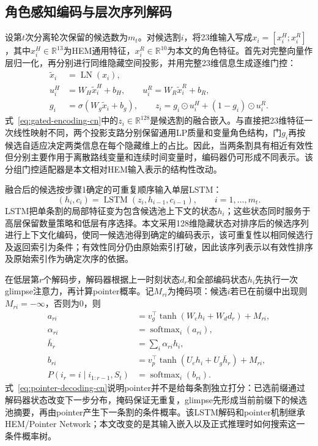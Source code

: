 \documentclass[final,5p,times,twocolumn]{elsarticle}
\begin{document}
\subsection{角色感知编码与层次序列解码}

设第$t$次分离轮次保留的候选数为$m_t$。对候选割$i$，将23维输入写成$x_i=[x_i^{H};x_i^{R}]$，其中$x_i^{H}\in\mathbb R^{13}$为HEM通用特征，$x_i^{R}\in\mathbb R^{10}$为本文的角色特征。首先对完整向量作层归一化，再分别进行同维隐藏空间投影，并用完整23维信息生成逐维门控：
\begin{equation}
\begin{aligned}
\widetilde x_i&=\operatorname{LN}(x_i),\\
u_i^{H}&=W_H\widetilde x_i^{H}+b_H,\qquad
u_i^{R}=W_R\widetilde x_i^{R}+b_R,\\
g_i&=\sigma(W_g\widetilde x_i+b_g),\qquad
z_i=g_i\odot u_i^{H}+(1-g_i)\odot u_i^{R}.
\end{aligned}
\label{eq:gated-encoding-cn}
\end{equation}
式~\eqref{eq:gated-encoding-cn}中的$z_i\in\mathbb R^{128}$是候选割的融合嵌入。与直接把23维特征一次线性映射不同，两个投影支路分别保留通用LP质量和变量角色结构，门$g_i$再按候选自适应决定两类信息在每个隐藏维上的占比。因此，当两条割具有相近有效性但分别主要作用于离散路线变量和连续时间变量时，编码器仍可形成不同表示。该分组门控适配器是本文相对HEM输入表示的结构性改动。

融合后的候选按步骤1确定的可重复顺序输入单层LSTM：
\begin{equation}
(h_i,c_i)=\operatorname{LSTM}(z_i,h_{i-1},c_{i-1}),\qquad i=1,\ldots,m_t .
\label{eq:lstm-encoding-cn}
\end{equation}
LSTM把单条割的局部特征变为包含候选池上下文的状态$h_i$；这些状态同时服务于高层保留数量策略和低层有序选择。本文采用128维隐藏状态对排序后的候选序列进行上下文化编码，使同一候选池得到确定的编码表示，该可重复性以相同候选行及返回索引为条件；有效性同分仍由原始索引打破，因此该序列表示以有效性排序及原始索引作为确定次序的依据。

在低层第$r$个解码步，解码器根据上一时刻状态$d_r$和全部编码状态$h_i$先执行一次glimpse注意力，再计算pointer概率。记$M_{ri}$为掩码项：候选$i$若已在前缀中出现则$M_{ri}=-\infty$，否则为0，则
\begin{equation}
\begin{aligned}
a_{ri}&=v_g^\top\tanh(W_e h_i+W_d d_r)+M_{ri},\\
\alpha_{ri}&=\operatorname{softmax}_i(a_{ri}),\\
\bar h_r&=\sum_i\alpha_{ri}h_i,\\
b_{ri}&=v_p^\top\tanh(U_e h_i+U_g\bar h_r)+M_{ri},\\
P(i_r=i\mid i_{1:r-1},S_t)&=\operatorname{softmax}_i(b_{ri}).
\end{aligned}
\label{eq:pointer-decoding-cn}
\end{equation}
式~\eqref{eq:pointer-decoding-cn}说明pointer并不是给每条割独立打分：已选前缀通过解码器状态改变下一步分布，掩码保证无重复，glimpse先形成当前前缀下的候选池摘要，再由pointer产生下一条割的条件概率。该LSTM解码和pointer机制继承HEM/Pointer Network；本文改变的是其输入嵌入以及正式推理时如何搜索这一条件概率树。
\end{document}

